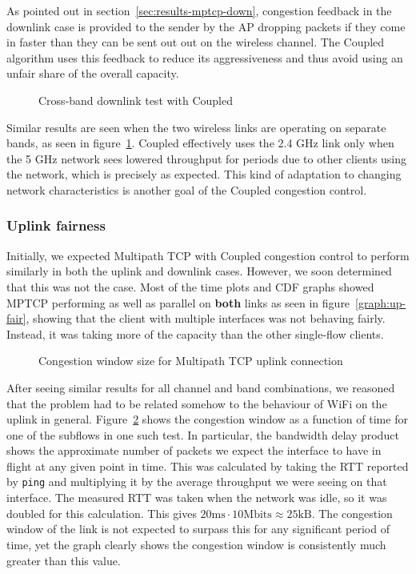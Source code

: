 
As pointed out in section~\ref{sec:results-mptcp-down}, congestion feedback in the downlink case is provided to the sender by the AP dropping packets if they come in faster than
they can be sent out out on the wireless channel. The Coupled algorithm uses this feedback to
reduce its aggressiveness and thus avoid using an unfair share of the overall
capacity.

\begin{figure}[h]
 \centering
 
 \caption{Cross-band downlink test with Coupled}\label{graph:cb-fairness-down}
\end{figure}

Similar results are seen when the two wireless links are operating on separate bands, as
seen in figure~\ref{graph:cb-fairness-down}. Coupled effectively uses the 2.4
GHz link only when the 5 GHz network sees lowered throughput for periods due to
other clients using the network, which is precisely as expected. This kind of adaptation to changing network characteristics is
another goal of the Coupled congestion control.

\subsubsection{Uplink fairness}
Initially, we expected Multipath TCP with Coupled congestion control to perform similarly in both the uplink and downlink cases. However, we soon determined that this was not the case. Most of the time plots and CDF graphs showed
MPTCP performing as well as parallel on \textbf{both} links as seen in
figure~\ref{graph:up-fair}, showing that the client with multiple interfaces was not behaving fairly. Instead, it was taking more of the capacity than the other single-flow clients.

\begin{figure}[h]
 \centering
 
 \caption{Congestion window size for Multipath TCP uplink connection}\label{graph:fairness-up-close}
\end{figure}

After seeing similar results for all channel and band combinations, we reasoned that
the problem had to be related somehow to the behaviour of WiFi on the uplink in
general. Figure~\ref{graph:fairness-up-close} shows the congestion window as a
function of time for one of the subflows in one such test. In particular, the bandwidth delay product shows the approximate number of packets
we expect the interface to have in flight at any given point in time. This
was calculated by taking the RTT reported by \texttt{ping} and multiplying it by
the average throughput we were seeing on that interface. The measured RTT was
taken when the network was idle, so it was doubled for this calculation. This
gives $20\text{ms} \cdot 10\text{Mbits} \approx 25\text{kB}$. The congestion
window of the link is not expected to surpass this for any significant period of
time, yet the graph clearly shows the congestion window is consistently much greater than this value.

